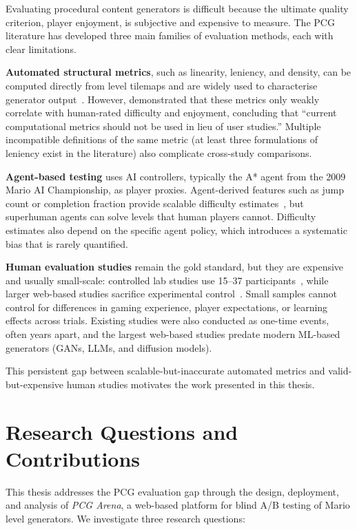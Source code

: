 \documentclass[shortabstract, mgr, english]{iithesis}
\begin{document}
Evaluating procedural content generators is difficult because the
ultimate quality criterion, player enjoyment, is subjective and expensive to measure. The PCG literature has developed three main families of
evaluation methods, each with clear limitations.

\textbf{Automated structural metrics}, such as linearity, leniency, and density,
can be computed directly from level tilemaps and are widely used to
characterise generator output~\citep{smith2010analyzing, horn2014comparative}.
However, \citet{marino2015empirical} demonstrated that these metrics only weakly
correlate with human-rated difficulty and enjoyment, concluding that ``current
computational metrics should not be used in lieu of user studies.'' Multiple
incompatible definitions of the same metric (at least three formulations of
leniency exist in the literature) also complicate cross-study comparisons.

\textbf{Agent-based testing} uses AI controllers, typically the A* agent from
the 2009 Mario AI Championship, as player proxies. Agent-derived features such
as jump count or completion fraction provide scalable difficulty
estimates~\citep{volz2018evolving}, but superhuman agents can solve levels that
human players cannot. Difficulty estimates also depend on the specific agent policy,
which introduces a systematic bias that is rarely quantified.

\textbf{Human evaluation studies} remain the gold standard, but they are expensive and
usually small-scale: controlled lab studies use 15--37
participants~\citep{shaker2011mario, marino2015empirical}, while larger web-based
studies sacrifice experimental control~\citep{pedersen2010modeling}.
Small samples cannot control for differences in gaming experience,
player expectations, or learning effects across trials.
Existing studies were also conducted as one-time events, often years
apart, and the largest
web-based studies predate modern ML-based generators (GANs, LLMs, and diffusion
models).

This persistent gap between scalable-but-inaccurate automated metrics and
valid-but-expensive human studies motivates the work presented in this thesis.

\section{Research Questions and Contributions}
\label{sec:intro-rq}

This thesis addresses the PCG evaluation gap through the design, deployment, and
analysis of \emph{PCG Arena}, a web-based platform for blind A/B testing of
Mario level generators. We investigate three research questions:
\end{document}
